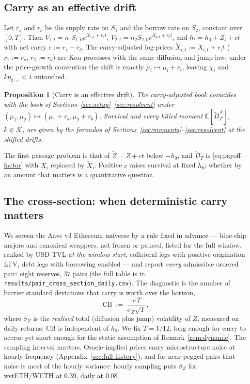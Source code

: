 \documentclass[11pt]{article}
\newcommand{\E}{\mathbb{E}}
\theoremstyle{plain}
\newtheorem{proposition}[theorem]{Proposition}
\theoremstyle{definition}
\theoremstyle{remark}
\begin{document}
\subsection{Carry as an effective drift}\label{sec:carry-drift}
Let $r_s$ and $r_b$ be the supply rate on $S_1$ and the borrow rate on $S_2$, constant over $[0,T]$.
Then $V_{1,t}=n_1S_{1,0}e^{X_{1,t}+r_st}$, $V_{2,t}=n_2S_{2,0}e^{X_{2,t}+r_bt}$, and
$h_t=h_0+Z_t+ct$ with net carry $c:=r_s-r_b$. The carry-adjusted log-prices
$\widetilde X_{i,t}:=X_{i,t}+r_it$ ($r_1:=r_s$, $r_2:=r_b$) are Kou processes with the same
diffusion and jump law; under the price-growth convention the shift is exactly
$\mu_i\mapsto\mu_i+r_i$, leaving $\chi_i$ and $k\eta_{2,+}<1$ untouched.

\begin{proposition}[Carry is an effective drift]\label{prop:carry}
The carry-adjusted book coincides with the book of Sections~\ref{sec:setup}--\ref{sec:resolvent}
under $(\mu_1,\mu_2)\mapsto(\mu_1+r_s,\mu_2+r_b)$. Survival and every killed moment
$\E[\widetilde\Pi_T^{\,k}]$, $k\in\mathcal K$, are given by the formulas of
Sections~\ref{sec:moments}--\ref{sec:resolvent} at the shifted drifts.
\end{proposition}

\noindent
The first-passage problem is that of $\widetilde Z=Z+ct$ below $-h_0$, and $\widetilde\Pi_T$ is
\eqref{eq:payoff-factor} with $X_i$ replaced by $\widetilde X_i$. Positive $c$ raises survival at
fixed $h_0$; whether by an amount that matters is a quantitative question.

\subsection{The cross-section: when deterministic carry matters}\label{sec:carry-crosssection}

We screen the Aave v3 Ethereum universe by a rule fixed in advance --- blue-chip majors and canonical
wrappers, not frozen or paused, listed for the full window, ranked by USD TVL \emph{at the window
start}, collateral legs with positive origination LTV, debt legs with borrowing enabled --- and
report \emph{every} admissible ordered pair: eight reserves, $37$ pairs (the full table is in
\texttt{results/pair\_cross\_section\_daily.csv}). The diagnostic is the number of barrier standard deviations that
carry is worth over the horizon,
\begin{equation}\label{eq:carry-ratio}
\mathrm{CB} \;:=\; \frac{c\,T}{\bar\sigma_Z\sqrt{T}},
\end{equation}
where $\bar\sigma_Z$ is the \emph{realised} total (diffusion plus jump) volatility of $Z$, measured
on daily returns; $\mathrm{CB}$ is independent of $h_0$. We fix $T=1/12$, long enough for carry to
accrue yet short enough for the static assumption of Remark~\ref{rem:dynamic}. The sampling
interval matters. Oracle-implied prices carry microstructure noise at hourly frequency
(Appendix~\ref{sec:full-history}), and for near-pegged pairs that noise is most of the hourly
variance: hourly sampling puts $\bar\sigma_Z$ for wstETH/WETH at $0.39$, daily at $0.08$.
\end{document}
